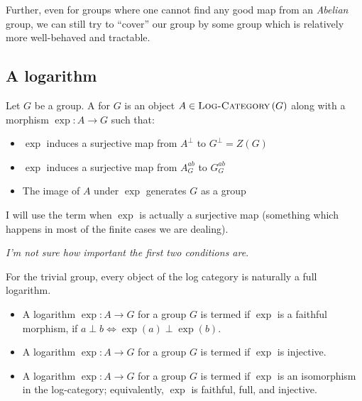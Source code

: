\documentclass[a4paper]{amsart}
\newcommand{\logcategory}[1]{\textsc{Log-Category}\left(#1\right)}
\begin{document}
Further, even for groups where one cannot find any good map from an
{\em Abelian} group, we can still try to ``cover'' our group by some
group which is relatively more well-behaved and tractable.

\subsection{A logarithm}

\begin{definer}
  Let $G$ be a group. A  for $G$ is an object $A
  \in \logcategory{G}$ along with a morphism $\exp :A \to G$ such that:

  \begin{itemize}

  \item $\exp$ induces a surjective map from $A^\perp$ to $G^\perp = Z(G)$

  \item $\exp$ induces a surjective map from $A^{ab}_G$ to $G^{ab}_G$

  \item The image of $A$ under $\exp$ generates $G$ as a group

  \end{itemize}

  I will use the term  when $\exp$
  is actually a surjective map (something which happens in most of the
  finite cases we are dealing).
\end{definer}

{\em I'm not sure how important the first two conditions are}.

For the trivial group, every object of the log category is naturally a
full logarithm.

\begin{definer}
  \begin{itemize}

  \item A logarithm $\exp:A \to G$ for a group $G$ is termed
     if $\exp$ is a faithful
    morphism, if $a \perp b \iff \exp(a) \perp \exp(b)$.

  \item A logarithm $\exp:A \to G$ for a group $G$ is termed
     if $\exp$ is injective.

  \item A logarithm $\exp:A \to G$ for a group $G$ is termed
     if $\exp$ is an
    isomorphism in the log-category; equivalently, $\exp$ is faithful,
    full, and injective.

  \end{itemize}
\end{definer}
\end{document}
